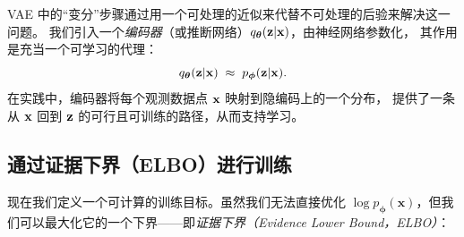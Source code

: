 VAE 中的“变分”步骤通过用一个可处理的近似来代替不可处理的后验来解决这一问题。
我们引入一个\emph{编码器}（或推断网络）$q_{\bm{\theta}}({\mathbf{z}}|{\mathbf{x}})$，由神经网络参数化，
其作用是充当一个可学习的代理：
\[
q_{\bm{\theta}}({\mathbf{z}}|{\mathbf{x}}) \;\approx\; p_{\bm{\phi}}({\mathbf{z}}|{\mathbf{x}}).
\]
在实践中，编码器将每个观测数据点 ${\mathbf{x}}$ 映射到隐编码上的一个分布，
提供了一条从 ${\mathbf{x}}$ 回到 ${\mathbf{z}}$ 的可行且可训练的路径，从而支持学习。




\subsection{通过证据下界（ELBO）进行训练}

现在我们定义一个可计算的训练目标。虽然我们无法直接优化 $\log p_{\bm{\phi}}(\mathbf{x})$，但我们可以最大化它的一个下界——即\emph{证据下界（Evidence Lower Bound，ELBO）}：

